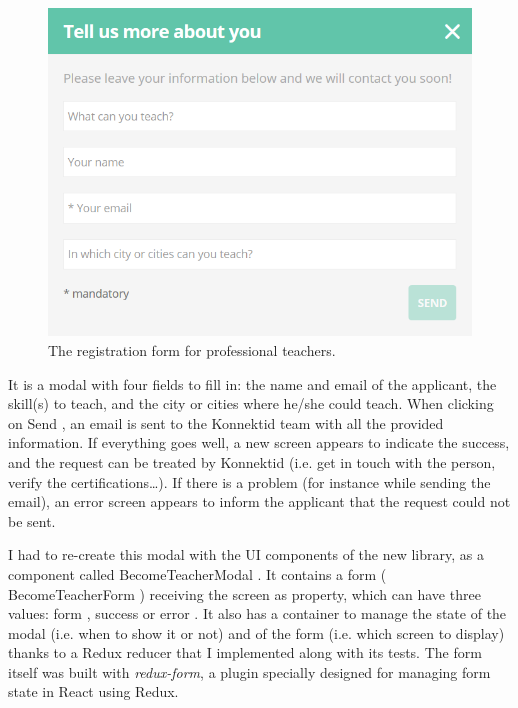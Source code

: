  \begin{figure}[H]
    \centering
    \includegraphics[scale=0.6]{figure/signUpFlow.png}
    \caption{The registration form for professional teachers.}
    \label{fig:signUpFlow}
\end{figure}

It is a modal with four fields to fill in: the name and email of the applicant, the skill(s) to teach, and the city or cities where he/she could teach. When clicking on \guillemotleft{} Send \guillemotright{}, an email is sent to the Konnektid team with all the provided information. If everything goes well, a new screen appears to indicate the success, and the request can be treated by Konnektid (i.e. get in touch with the person, verify the certifications\ldots). If there is a problem (for instance while sending the email), an error screen appears to inform the applicant that the request could not be sent.

I had to re-create this modal with the UI components of the new library, as a component called \guillemotleft{} BecomeTeacherModal \guillemotright{}. It contains a form (\guillemotleft{} BecomeTeacherForm \guillemotright{}) receiving the screen as property, which can have three values: \guillemotleft{} form \guillemotright{}, \guillemotleft{} success \guillemotright{} or \guillemotleft{} error \guillemotright{}. It also has a container to manage the state of the modal (i.e. when to show it or not) and of the form (i.e. which screen to display) thanks to a Redux reducer that I implemented along with its tests. The form itself was built with \textit{redux-form}, a plugin specially designed for managing form state in React using Redux.

